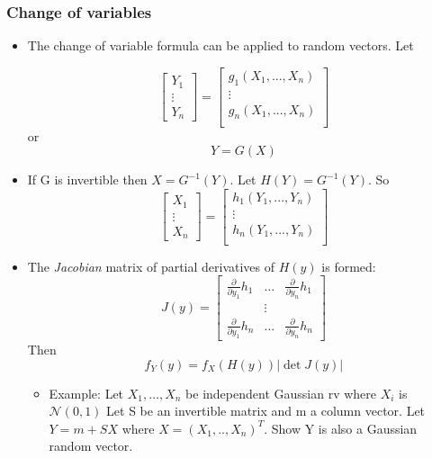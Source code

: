 \documentclass[12pt]{article}
\begin{document}
\subsubsection{Change of variables}
\begin{itemize}
\item The change of variable formula can be applied to random vectors. Let

\[
\begin{bmatrix}
Y_1\\
\vdots \\
Y_n
\end{bmatrix}
=
\begin{bmatrix}
g_1(X_1,...,X_n) \\
\vdots \\
g_n(X_1,...,X_n) \\
\end{bmatrix}
\]
or 
\[ Y = G(X)
\]
\item If G is invertible then $X=G^{-1}(Y).$ Let $H(Y)=G^{-1}(Y)$. So 
\[
\begin{bmatrix}
X_1\\
\vdots \\
X_n
\end{bmatrix}
=
\begin{bmatrix}
h_1(Y_1,...,Y_n) \\
\vdots \\
h_n(Y_1,...,Y_n) \\
\end{bmatrix}
\]
\item The \textit{Jacobian }matrix of partial derivatives of $H(y)$ is formed:
\[
J(y) = 
\begin{bmatrix}
\frac{\partial }{\partial y_1}h_1 & \hdots & \frac{\partial }{\partial y_n}h_1 \\
& \vdots & \\
\frac{\partial }{\partial y_1}h_n & \hdots & \frac{\partial }{\partial y_n}h_n
\end{bmatrix}
\]
Then 
\[
f_Y(y) = f_X(H(y))|\det J(y)|
\]
\begin{itemize}
\item Example: Let $X_1,...,X_n$ be independent Gaussian rv where $X_i$ is $\mathcal{N}(0,1)$ Let S be an invertible matrix and m a column vector. Let $Y = m + SX$ where $X=(X_1,..,X_n)^T$. Show Y is also a Gaussian random vector. \\


\end{itemize}
\end{itemize}
\end{document}
